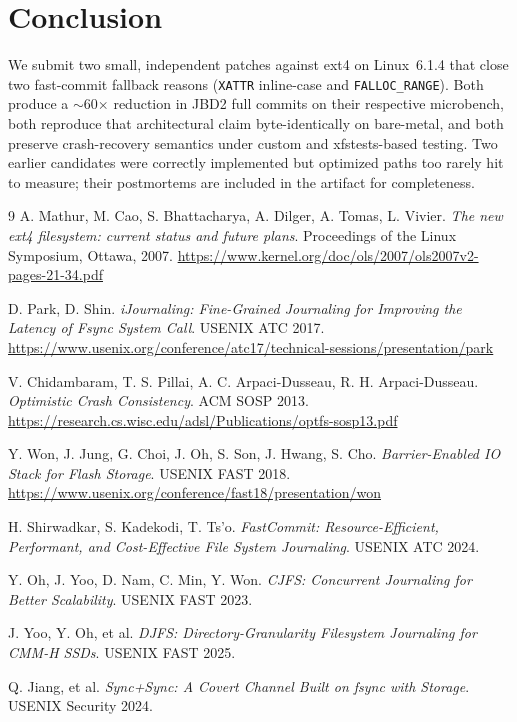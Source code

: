 \documentclass[11pt,a4paper]{article}
\begin{document}
\section{Conclusion}

We submit two small, independent patches against ext4 on
Linux~6.1.4 that close two fast-commit fallback reasons
(\texttt{XATTR} inline-case and \texttt{FALLOC\_RANGE}). Both
produce a $\sim$60$\times$ reduction in JBD2 full commits on
their respective microbench, both reproduce that
architectural claim byte-identically on bare-metal, and both
preserve crash-recovery semantics under custom and xfstests-based
testing. Two earlier candidates were correctly implemented but
optimized paths too rarely hit to measure; their postmortems are
included in the artifact for completeness.

\begin{thebibliography}{9}
A. Mathur, M. Cao, S. Bhattacharya, A. Dilger, A. Tomas, L. Vivier.
\textit{The new ext4 filesystem: current status and future plans}.
Proceedings of the Linux Symposium, Ottawa, 2007.
\url{https://www.kernel.org/doc/ols/2007/ols2007v2-pages-21-34.pdf}

D. Park, D. Shin.
\textit{iJournaling: Fine-Grained Journaling for Improving the
Latency of Fsync System Call}.
USENIX ATC 2017.
\url{https://www.usenix.org/conference/atc17/technical-sessions/presentation/park}

V. Chidambaram, T. S. Pillai, A. C. Arpaci-Dusseau, R. H.
Arpaci-Dusseau.
\textit{Optimistic Crash Consistency}.
ACM SOSP 2013.
\url{https://research.cs.wisc.edu/adsl/Publications/optfs-sosp13.pdf}

Y. Won, J. Jung, G. Choi, J. Oh, S. Son, J. Hwang, S. Cho.
\textit{Barrier-Enabled IO Stack for Flash Storage}.
USENIX FAST 2018.
\url{https://www.usenix.org/conference/fast18/presentation/won}

H. Shirwadkar, S. Kadekodi, T. Ts'o.
\textit{FastCommit: Resource-Efficient, Performant, and
Cost-Effective File System Journaling}.
USENIX ATC 2024.

Y. Oh, J. Yoo, D. Nam, C. Min, Y. Won.
\textit{CJFS: Concurrent Journaling for Better Scalability}.
USENIX FAST 2023.

J. Yoo, Y. Oh, et al.
\textit{DJFS: Directory-Granularity Filesystem Journaling for
CMM-H SSDs}.
USENIX FAST 2025.

Q. Jiang, et al.
\textit{Sync+Sync: A Covert Channel Built on fsync with Storage}.
USENIX Security 2024.
\end{thebibliography}
\end{document}
